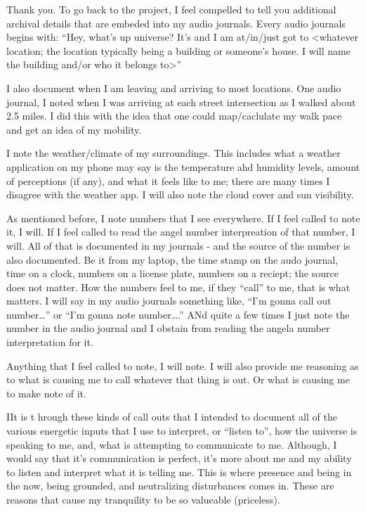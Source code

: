\documentclass{article}
\begin{document}
\medskip

Thank you. To go back to the project, I feel compelled to tell you
additional archival details that are embeded into my audio journals.
Every audio journals begins with: ``Hey, what's up universe? It's and I
am at/in/just got to \textless whatever location; the location typically
being a building or someone's house. I will name the building and/or who
it belongs to\textgreater{}''

I also document when I am leaving and arriving to most locations. One
audio journal, I noted when I was arriving at each street intersection
as I walked about 2.5 miles. I did this with the idea that one could
map/caclulate my walk pace and get an idea of my mobility.

I note the weather/climate of my surroundings. This includes what a
weather application on my phone may say is the temperature ahd humidity
levels, amount of perceptions (if any), and what it feels like to me;
there are many times I disagree with the weather app. I will also note
the cloud cover and sun visibility.

As mentioned before, I note numbers that I see everywhere. If I feel
called to note it, I will. If I feel called to read the angel number
interpreation of that number, I will. All of that is documented in my
journals - and the source of the number is also documented. Be it from
my laptop, the time stamp on the audo journal, time on a clock, numbers
on a license plate, numbers on a reciept; the source does not matter.
How the numbers feel to me, if they ``call'' to me, that is what
matters. I will say in my audio journals something like, ``I'm gonna
call out number\ldots{}'' or ``I'm gonna note number\ldots.'' ANd quite
a few times I just note the number in the audio journal and I obstain
from reading the angela number interpretation for it.

Anything that I feel called to note, I will note. I will also provide me
reasoning as to what is causing me to call whatever that thing is out.
Or what is causing me to make note of it.

IIt is t hrough these kinds of call outs that I intended to document all
of the various energetic inputs that I use to interpret, or ``listen
to'', how the universe is speaking to me, and, what is attempting to
communicate to me. Although, I would say that it's communication is
perfect, it's more about me and my ability to listen and interpret what
it is telling me. This is where presence and being in the now, being
grounded, and neutralizing disturbances comes in. These are reasons that
cause my tranquility to be so valueable (priceless).
\end{document}
